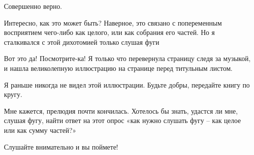 \documentclass[../main.tex]{subfiles}
\begin{document}
\begin{dialogue}
 Совершенно верно.

 Интересно, как это может быть? Наверное, это связано с попеременным восприятием чего-либо как целого, или как собрания его частей. Но я сталкивался с этой дихотомией только слушая фуги

 Вот это да! Посмотрите-ка! Я только что перевернула страницу следя за музыкой, и нашла великолепную иллюстрацию на странице перед титульным листом.

 Я раньше никогда не видел этой иллюстрации. Будьте добры, передайте книгу по кругу.


 Мне кажется, прелюдия почти кончилась. Хотелось бы знать, удастся ли мне, слушая фугу, найти ответ на этот опрос «как нужно слушать фугу \--- как целое или как сумму частей?»

 Слушайте внимательно и вы поймете!


\end{dialogue}
\end{document}
